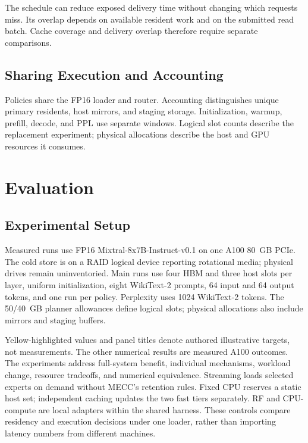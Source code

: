 \documentclass[conference,9pt,letterpaper]{IEEEtran}
\begin{document}
The schedule can reduce exposed delivery time without changing which requests miss. Its overlap depends on available resident work and on the submitted read batch. Cache coverage and delivery overlap therefore require separate comparisons.

\subsection{Sharing Execution and Accounting}
Policies share the FP16 loader and router. Accounting distinguishes unique primary residents, host mirrors, and staging storage. Initialization, warmup, prefill, decode, and PPL use separate windows. Logical slot counts describe the replacement experiment; physical allocations describe the host and GPU resources it consumes.

\section{Evaluation}
\label{sec:evaluation}
\subsection{Experimental Setup}
Measured runs use FP16 Mixtral-8x7B-Instruct-v0.1 on one A100 80~GB PCIe. The cold store is on a RAID logical device reporting rotational media; physical drives remain uninventoried. Main runs use four HBM and three host slots per layer, uniform initialization, eight WikiText-2 prompts, 64 input and 64 output tokens, and one run per policy. Perplexity uses 1024 WikiText-2 tokens. The 50/40~GB planner allowances define logical slots; physical allocations also include mirrors and staging buffers.

Yellow-highlighted values and panel titles denote authored illustrative targets, not measurements. The other numerical results are measured A100 outcomes. The experiments address full-system benefit, individual mechanisms, workload change, resource tradeoffs, and numerical equivalence. Streaming loads selected experts on demand without MECC's retention rules. Fixed CPU reserves a static host set; independent caching updates the two fast tiers separately. RF and CPU-compute are local adapters within the shared harness. These controls compare residency and execution decisions under one loader, rather than importing latency numbers from different machines.
\end{document}

